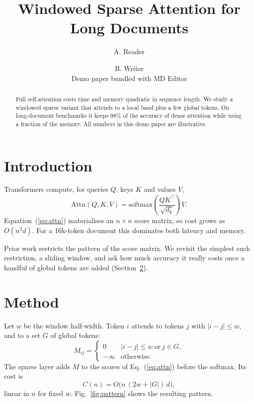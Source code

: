 \documentclass[11pt]{article}
\title{\textbf{Windowed Sparse Attention for Long Documents}}
\author{A. Reader \and B. Writer\\\small Demo paper bundled with MD Editor}
\date{}
\begin{document}
\maketitle

\begin{abstract}
Full self-attention costs time and memory quadratic in sequence length. We study a
windowed sparse variant that attends to a local band plus a few global tokens. On
long-document benchmarks it keeps 98\% of the accuracy of dense attention while using
a fraction of the memory. All numbers in this demo paper are illustrative.
\end{abstract}

\section{Introduction}
Transformers compute, for queries $Q$, keys $K$ and values $V$,
\begin{equation}
  \mathrm{Attn}(Q,K,V) = \mathrm{softmax}\!\left(\frac{QK^\top}{\sqrt{d_k}}\right)V .
  \label{eq:attn}
\end{equation}
Equation~(\ref{eq:attn}) materialises an $n \times n$ score matrix, so cost grows as
$O(n^2 d)$. For a 16k-token document this dominates both latency and memory.

Prior work restricts the pattern of the score matrix. We revisit the simplest such
restriction, a sliding window, and ask how much accuracy it really costs once a handful
of global tokens are added (Section~\ref{sec:method}).

\section{Method}\label{sec:method}
Let $w$ be the window half-width. Token $i$ attends to tokens $j$ with $|i-j|\le w$, and
to a set $G$ of global tokens:
\begin{equation}
  M_{ij} = \begin{cases} 0 & |i-j| \le w \ \text{or}\ j \in G,\\ -\infty & \text{otherwise.}\end{cases}
  \label{eq:mask}
\end{equation}
The sparse layer adds $M$ to the scores of Eq.~(\ref{eq:attn}) before the softmax. Its
cost is
\begin{equation}
  C(n) = O\big(n\,(2w + |G|)\,d\big),
  \label{eq:cost}
\end{equation}
linear in $n$ for fixed $w$. Fig.~\ref{fig:pattern} shows the resulting pattern.
\end{document}
